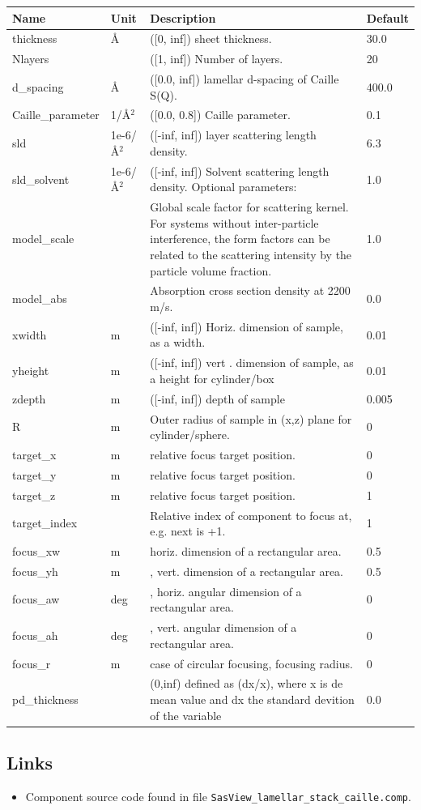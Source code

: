\begin{longtable}{p{}p{}p{}p{}}
\toprule
\textbf{Name} & \textbf{Unit} & \textbf{Description} & \textbf{Default} \\
\midrule
\endhead
thickness & \AA{} & ([0, inf]) sheet thickness. & 30.0 \\
Nlayers &  & ([1, inf]) Number of layers. & 20 \\
d\_spacing & \AA{} & ([0.0, inf]) lamellar d-spacing of Caille S(Q). & 400.0 \\
Caille\_parameter & 1/\AA{}$^{2}$ & ([0.0, 0.8]) Caille parameter. & 0.1 \\
sld & 1e-6/\AA{}$^{2}$ & ([-inf, inf]) layer scattering length density. & 6.3 \\
sld\_solvent & 1e-6/\AA{}$^{2}$ & ([-inf, inf]) Solvent scattering length density. Optional parameters: & 1.0 \\
model\_scale &   & Global scale factor for scattering kernel. For systems without inter-particle interference, the form factors can be related to the scattering intensity by the particle volume fraction. & 1.0 \\
model\_abs &   & Absorption cross section density at 2200 m/s. & 0.0 \\
xwidth & m & ([-inf, inf]) Horiz. dimension of sample, as a width. & 0.01 \\
yheight & m & ([-inf, inf]) vert . dimension of sample, as a height for cylinder/box & 0.01 \\
zdepth & m & ([-inf, inf]) depth of sample & 0.005 \\
R & m & Outer radius of sample in (x,z) plane for cylinder/sphere. & 0 \\
target\_x & m & relative focus target position. & 0 \\
target\_y & m & relative focus target position. & 0 \\
target\_z & m & relative focus target position. & 1 \\
target\_index &   & Relative index of component to focus at, e.g. next is +1. & 1 \\
focus\_xw & m & horiz. dimension of a rectangular area. & 0.5 \\
focus\_yh & m & , vert. dimension of a rectangular area. & 0.5 \\
focus\_aw & deg & , horiz. angular dimension of a rectangular area. & 0 \\
focus\_ah & deg & , vert. angular dimension of a rectangular area. & 0 \\
focus\_r & m & case of circular focusing, focusing radius. & 0 \\
pd\_thickness &  & (0,inf) defined as (dx/x), where x is de mean value and dx the standard devition of the variable & 0.0 \\
\bottomrule
\end{longtable}

\subsection*{Links}
\begin{itemize}
  \item Component source code found in file \texttt{SasView\_lamellar\_stack\_caille.comp}.
\end{itemize}
